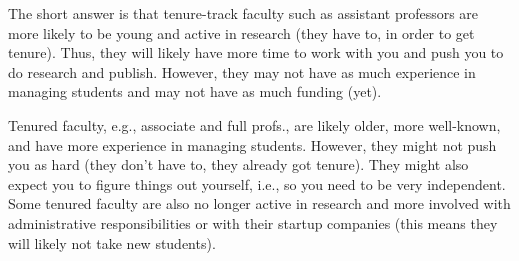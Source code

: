 \documentclass[oneside,11pt]{memoir}
\newenvironment{commentbox}[1][]{
\small
    \begin{mybox}
    {\small \textbf{#1}}
 }{
   \end{mybox}
}
\begin{document}
The short answer is that tenure-track faculty such as assistant professors are more likely to be young and active in research (they have to, in order to get tenure). Thus, they will likely have more time to work with you and push you to do research and publish. However, they may not have as much experience in managing students and may not have as much funding (yet).

Tenured faculty, e.g., associate and full profs., are likely older, more well-known, and have more experience in managing students.  However, they might not push you as hard (they don't have to, they already got tenure). They might also expect you to figure things out yourself, i.e., so you need to be very independent.  Some tenured faculty are also no longer active in research and more involved with administrative responsibilities or with their startup companies (this means they will likely not take new students). 


\end{document}
